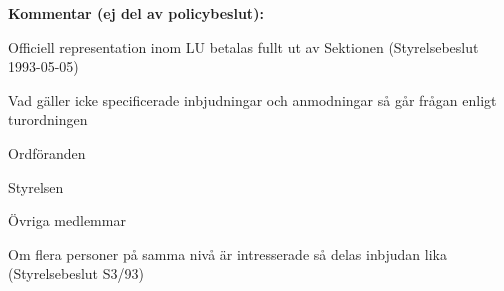 \documentclass[../_main/handlingar.tex]{subfiles}
\begin{document}
\vspace{20px}
{\large \textbf{Kommentar (ej del av policybeslut):}}
\begin{dashlist}
    \item Officiell representation inom LU betalas fullt ut av Sektionen
    (Styrelsebeslut 1993-05-05)
    \item Vad gäller icke specificerade inbjudningar och anmodningar så går
    frågan enligt turordningen
    \begin{numplist}
    \item Ordföranden
    \item Styrelsen
    \item Övriga medlemmar
    \end{numplist}
    \item Om flera personer på samma nivå är intresserade så delas inbjudan lika
    (Styrelsebeslut S3/93)
\end{dashlist}
\end{document}
